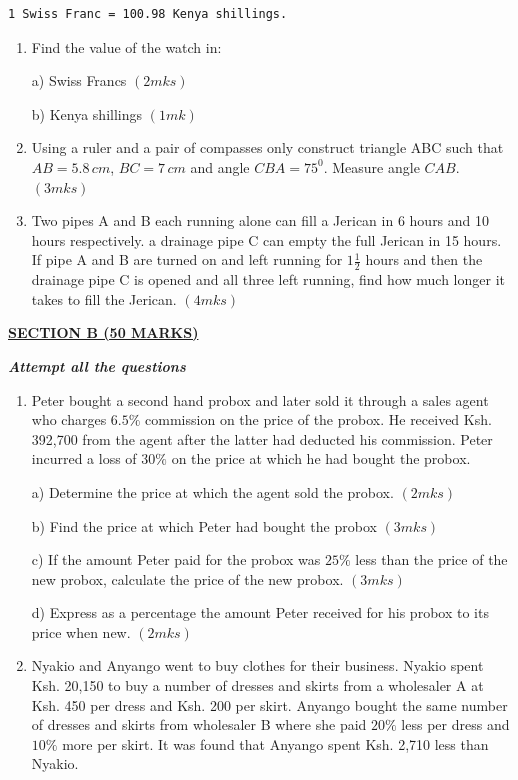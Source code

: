 \documentclass[
  a4paperpaper,
]{scrbook}
\begin{document}
\begin{tcolorbox}
\begin{verbatim}
1 Swiss Franc = 100.98 Kenya shillings.
\end{verbatim}

\begin{enumerate}
\def\labelenumi{\arabic{enumi}.}
\setcounter{enumi}{14}
\item
  Find the value of the watch in:

  a) Swiss Francs \((2mks)\)

  b) Kenya shillings \((1mk)\)
\item
  Using a ruler and a pair of compasses only construct triangle ABC such
  that \(AB= 5.8\,cm\), \(BC = 7\,cm\) and angle \(CBA = 75^0\). Measure
  angle \(CAB\). \((3mks)\)
\item
  Two pipes A and B each running alone can fill a Jerican in 6 hours and
  10 hours respectively. a drainage pipe C can empty the full Jerican in
  15 hours. If pipe A and B are turned on and left running for
  \(1\frac{1}{2}\) hours and then the drainage pipe C is opened and all
  three left running, find how much longer it takes to fill the Jerican.
  \((4mks)\)
\end{enumerate}

\ul{\textbf{SECTION B (50 MARKS)}}

\textbf{\emph{Attempt all the questions}}

\begin{enumerate}
\def\labelenumi{\arabic{enumi}.}
\setcounter{enumi}{17}
\item
  Peter bought a second hand probox and later sold it through a sales
  agent who charges \(6.5\%\) commission on the price of the probox. He
  received Ksh. 392,700 from the agent after the latter had deducted his
  commission. Peter incurred a loss of \(30\%\) on the price at which he
  had bought the probox.

  a) Determine the price at which the agent sold the probox. \((2mks)\)

  b) Find the price at which Peter had bought the probox \((3mks)\)

  c) If the amount Peter paid for the probox was \(25\%\) less than the
  price of the new probox, calculate the price of the new probox.
  \((3mks)\)

  d) Express as a percentage the amount Peter received for his probox to
  its price when new. \((2mks)\)
\item
  Nyakio and Anyango went to buy clothes for their business. Nyakio
  spent Ksh. 20,150 to buy a number of dresses and skirts from a
  wholesaler A at Ksh. 450 per dress and Ksh. 200 per skirt. Anyango
  bought the same number of dresses and skirts from wholesaler B where
  she paid \(20\%\) less per dress and \(10\%\) more per skirt. It was
  found that Anyango spent Ksh. 2,710 less than Nyakio.


\end{enumerate}
\end{tcolorbox}
\end{document}
